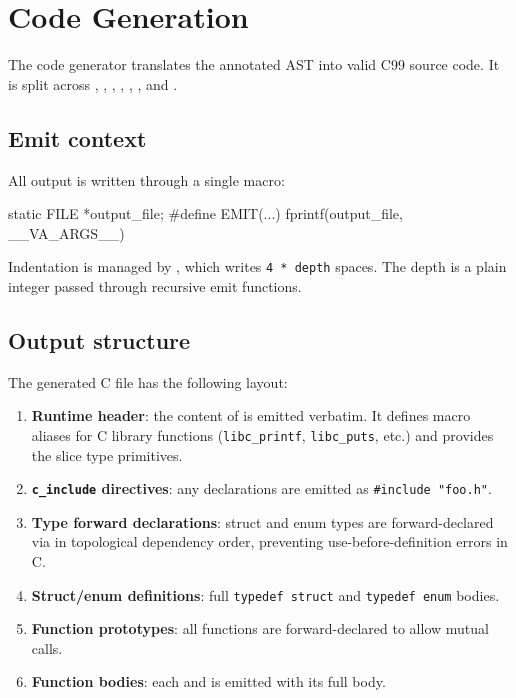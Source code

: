 \chapter{Code Generation}
\label{chap:19-codegen}

\pnum
The code generator translates the annotated AST into valid C99 source code.  It
is split across , ,
, , ,
, and .

\section{Emit context}
\label{sec:gen-ctx}

\pnum
All output is written through a single macro:

\begin{ccode}
static FILE *output_file;
#define EMIT(...)  fprintf(output_file, __VA_ARGS__)
\end{ccode}

\pnum
Indentation is managed by , which writes
\texttt{4 * depth} spaces.  The depth is a plain integer passed through
recursive emit functions.

\section{Output structure}
\label{sec:gen-structure}

\pnum
The generated C file has the following layout:
\begin{enumerate}
\item \textbf{Runtime header}: the content of 
  is emitted verbatim.  It defines macro aliases for C library functions
  (\texttt{libc\_printf}, \texttt{libc\_puts}, etc.) and provides the slice
  type primitives.
\item \textbf{\texttt{c\_include} directives}: any 
  declarations are emitted as \texttt{\#include "foo.h"}.
\item \textbf{Type forward declarations}: struct and enum types are forward-declared
  via  in topological dependency order, preventing
  use-before-definition errors in C.
\item \textbf{Struct/enum definitions}: full \texttt{typedef struct} and
  \texttt{typedef enum} bodies.
\item \textbf{Function prototypes}: all functions are forward-declared to allow
  mutual calls.
\item \textbf{Function bodies}: each  and
   is emitted with its full body.
\end{enumerate}

